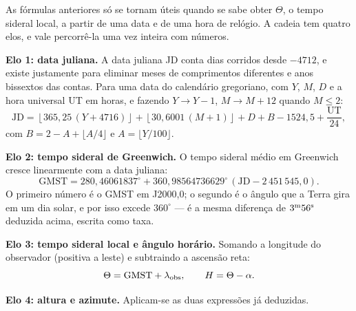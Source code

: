 \documentclass[11pt,a4paper]{article}
\begin{document}
As fórmulas anteriores só se tornam úteis quando se sabe obter $\Theta$, o tempo sideral
local, a partir de uma data e de uma hora de relógio. A cadeia tem quatro elos, e vale
percorrê-la uma vez inteira com números.

\textbf{Elo 1: data juliana.} A data juliana JD conta dias corridos desde
$-4712$, e existe justamente para eliminar meses de comprimentos diferentes e anos
bissextos das contas. Para uma data do calendário gregoriano, com $Y$, $M$, $D$ e a hora
universal UT em horas, e fazendo $Y\to Y-1$, $M\to M+12$ quando $M\le2$:
\[
\mathrm{JD}=\left\lfloor365{,}25\,(Y+4716)\right\rfloor
+\left\lfloor30{,}6001\,(M+1)\right\rfloor+D+B-1524{,}5+\frac{\mathrm{UT}}{24},
\]
com $B=2-A+\lfloor A/4\rfloor$ e $A=\lfloor Y/100\rfloor$.

\textbf{Elo 2: tempo sideral de Greenwich.} O tempo sideral médio em Greenwich cresce
linearmente com a data juliana:
\[
\mathrm{GMST}=280{,}46061837^\circ+360{,}98564736629^\circ\,(\mathrm{JD}-2\,451\,545{,}0).
\]
O primeiro número é o GMST em J2000{,}0; o segundo é o ângulo que a Terra gira em um dia
solar, e por isso excede $360^\circ$ --- é a mesma diferença de $3^{\rm m}56^{\rm s}$
deduzida acima, escrita como taxa.

\textbf{Elo 3: tempo sideral local e ângulo horário.} Somando a longitude do observador
(positiva a leste) e subtraindo a ascensão reta:
\[
\Theta=\mathrm{GMST}+\lambda_{\rm obs},\qquad H=\Theta-\alpha.
\]

\textbf{Elo 4: altura e azimute.} Aplicam-se as duas expressões já deduzidas.
\end{document}
